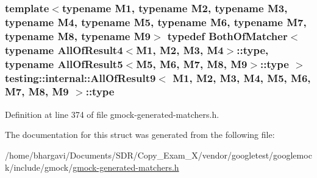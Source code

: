 \subsubsection[{\texorpdfstring{type}{type}}]{\setlength{\rightskip}{0pt plus 5cm}template$<$typename M1, typename M2, typename M3, typename M4, typename M5, typename M6, typename M7, typename M8, typename M9$>$ typedef {\bf Both\+Of\+Matcher}$<$ typename {\bf All\+Of\+Result4}$<$M1, M2, M3, M4$>$\+::{\bf type}, typename {\bf All\+Of\+Result5}$<$M5, M6, M7, M8, M9$>$\+::{\bf type} $>$ {\bf testing\+::internal\+::\+All\+Of\+Result9}$<$ M1, M2, M3, M4, M5, M6, M7, M8, M9 $>$\+::{\bf type}}\hypertarget{structtesting_1_1internal_1_1_all_of_result9_ade56e18d2e0b745968b87fc394710edc}{}\label{structtesting_1_1internal_1_1_all_of_result9_ade56e18d2e0b745968b87fc394710edc}


Definition at line 374 of file gmock-\/generated-\/matchers.\+h.



The documentation for this struct was generated from the following file\+:\begin{DoxyCompactItemize}
\item 
/home/bhargavi/\+Documents/\+S\+D\+R/\+Copy\+\_\+\+Exam\+\_\+X/vendor/googletest/googlemock/include/gmock/\hyperlink{gmock-generated-matchers_8h}{gmock-\/generated-\/matchers.\+h}\end{DoxyCompactItemize}
